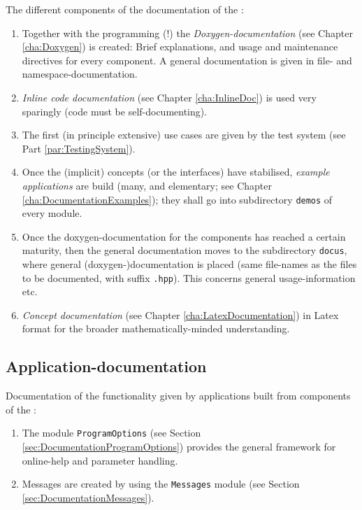 \documentclass{book}
\newcommand{\name}[1]{\texttt{#1}}
\begin{document}
The different components of the documentation of the \OKlibrary:
\begin{enumerate}
\item Together with the programming (!) the \emph{Doxygen-documentation} (see Chapter \ref{cha:Doxygen}) is created: Brief explanations, and usage and maintenance directives for every component. A general documentation is given in file- and namespace-documentation.
\item \emph{Inline code documentation} (see Chapter \ref{cha:InlineDoc}) is used very sparingly (code must be self-documenting).
\item The first (in principle extensive) use cases are given by the test system (see Part \ref{par:TestingSystem}).
\item Once the (implicit) concepts (or the interfaces) have stabilised, \emph{example applications} are build (many, and elementary; see Chapter \ref{cha:DocumentationExamples}); they shall go into subdirectory \name{demos} of every module.
\item Once the doxygen-documentation for the components has reached a certain maturity, then the general documentation moves to the subdirectory \name{docus}, where general (doxygen-)documentation is placed (same file-names as the files to be documented, with suffix \name{.hpp}). This concerns general usage-information etc.
\item \emph{Concept documentation} (see Chapter \ref{cha:LatexDocumentation}) in Latex format for the broader mathematically-minded understanding.
\end{enumerate}




\subsection{Application-documentation}
\label{sec:DocumentationOverviewApplication}

Documentation of the functionality given by applications built from components of the \OKlibrary:
\begin{enumerate}
\item The module \texttt{ProgramOptions} (see Section \ref{sec:DocumentationProgramOptions}) provides the general framework for online-help and parameter handling.
\item Messages are created by using the \texttt{Messages} module (see Section \ref{sec:DocumentationMessages}).
\end{enumerate}
\end{document}
